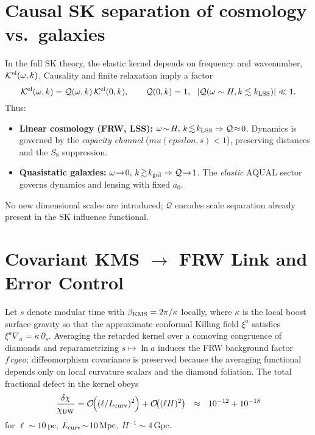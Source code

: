 \documentclass[aps,prd,onecolumn,superscriptaddress,nofootinbib]{revtex4-2}
\def\cgeo{cgeo}%
\def\eps{epsilon}%
\def\mu{mu}%
\providecommand{\cgeo}{c_{\rm geo}}
\providecommand{\eps}{\varepsilon}
\providecommand{\be}{\begin{equation}}
\providecommand{\ee}{\end{equation}}
\begin{document}
\section{Causal SK separation of cosmology vs.\ galaxies}
\label{sec:sk-separation}
In the full SK theory, the elastic kernel depends on frequency and wavenumber, \(\mathcal K^{\rm el}(\omega,k)\). Causality and finite relaxation imply a factor
\[
\mathcal K^{\rm el}(\omega,k)=\mathcal Q(\omega,k)\,\mathcal K^{\rm el}(0,k),\qquad \mathcal Q(0,k)=1,\ \ |\mathcal Q(\omega\sim H,k\lesssim k_{\rm LSS})|\ll 1.
\]
Thus:
\begin{itemize}[leftmargin=*,noitemsep,topsep=0pt]
\item \textbf{Linear cosmology (FRW, LSS):} \(\omega\!\sim\!H,\,k\!\lesssim\!k_{\rm LSS}\Rightarrow \mathcal Q\!\approx\!0\). Dynamics is governed by the \emph{capacity channel} (\(\mu(\eps,s)<1\)), preserving distances and the \(S_8\) suppression.
\item \textbf{Quasistatic galaxies:} \(\omega\!\to\!0,\,k\!\gtrsim\!k_{\rm gal}\Rightarrow \mathcal Q\!\to\!1\). The \emph{elastic} AQUAL sector governs dynamics and lensing with fixed \(a_0\).
\end{itemize}
No new dimensional scales are introduced; \(\mathcal Q\) encodes scale separation already present in the SK influence functional.

\section{Covariant KMS \texorpdfstring{$\to$}{->} FRW Link and Error Control}
\label{sec:kms-frw}
Let \(s\) denote modular time with \(\beta_{\rm KMS}=2\pi/\kappa\) locally, where \(\kappa\) is the local boost surface gravity so that the approximate conformal Killing field \(\xi^a\) satisfies \(\xi^a\nabla_a=\kappa\,\partial_s\).
Averaging the retarded kernel over a comoving congruence of diamonds and reparametrizing \(s\mapsto \ln a\) induces the FRW background factor \(f\,\cgeo\); diffeomorphism covariance is preserved because the averaging functional depends only on local curvature scalars and the diamond foliation. The total fractional defect in the kernel obeys
\be
\label{eq:chi-defect}
\frac{\delta\chi}{\chi_{\rm BW}}=\mathcal O\!\Big((\ell/L_{\rm curv})^2\Big)+\mathcal O\!\big((\ell H)^2\big)
\ \ \approx\ \ 10^{-12}+10^{-18}
\ee
for \(\ell\!\sim\!10\,\mathrm{pc}\), \(L_{\rm curv}\!\sim\!10\,\mathrm{Mpc}\), \(H^{-1}\!\sim\!4\,\mathrm{Gpc}\).
\end{document}

